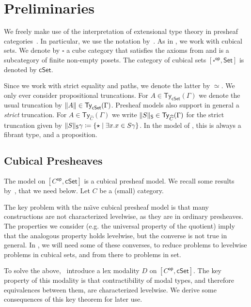 \documentclass[10pt,a4paper]{article}
\theoremstyle{definition}
\theoremstyle{remark}
\newcommand{\Set}{\mathsf{Set}}
\newcommand{\cSet}{\mathsf{cSet}}
\DeclareMathOperator\op{\mathsf{op}}
\newcommand\Ty{\mathsf{Ty}}
\DeclarePairedDelimiter\set{\{}{\}}
\begin{document}
\section{Preliminaries}\label{sec:preliminaries}

We freely make use of the interpretation of extensional type theory in presheaf categories~\cite{hofmann,huber-phd-thesis}.
In particular, we use the notation by~\cite{huber-phd-thesis}.
As in \cite{draft}, we work with cubical sets.
We denote by \(\square\) a cube category that satisfies the axioms from \cite{survey} and is a subcategory of finite non-empty posets.
The category of cubical sets \([\square^{\op}, \Set]\) is denoted by \(\cSet\).

Since we work with strict equality and paths, we denote the latter by \(\simeq\).
We only ever consider propositional truncations.
For \(A \in \Ty_{\cSet}(\Gamma)\) we denote the usual truncation by \(\trunc{A} \in \Ty_{\cSet}(\Gamma)\).
Presheaf models also support in general a \emph{strict} truncation.
For \(A \in \Ty_{\widehat{C}}(\Gamma)\) we write \(\trunc*{S} \in \Ty_{\widehat{C}}(\Gamma)\) for the strict truncation given by \(\trunc*{S}\gamma \coloneqq \set{ \star \mid \exists x. x \in S\gamma }\).
In the model of \HoTT{}, this is always a fibrant type, and a proposition.


\subsection{Cubical Presheaves}

The model on \([C^{\op}, \cSet]\) is a cubical presheaf model.
We recall some results by~\cite{CRS21}, that we need below.
Let \(C\) be a (small) category.

The key problem with the na{\"\i}ve cubical presheaf model is that many constructions are not characterized levelwise, as they are in ordinary presheaves.
The properties we consider (e.g. the universal property of the quotient) imply that the analogous property holds levelwise, but the converse is not true in general.
In , we will need some of these converses, to reduce problems to levelwise problems in cubical sets, and from there to problems in set.

To solve the above,~\cite{CRS21} introduce a lex modality \(D\) on \([C^{\op}, \cSet]\).
The key property of this modality is that contractibility of modal types, and therefore equivalences between them, are characterized levelwise.
We derive some consequences of this key theorem for later use.
\end{document}
